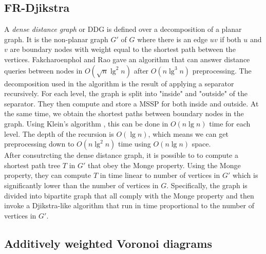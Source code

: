 \subsection{FR-Djikstra}
A \textit{dense distance graph} or DDG is defined over a decomposition of a planar
graph. It is the non-planar graph $G'$ of $G$ where there is an edge $uv$ if both $u$ and
$v$ are boundary nodes with weight equal to the shortest path between the vertices.
Fakcharoenphol and Rao \cite{fakcharoenphol2006planar} gave an algorithm that can answer
distance queries between nodes in $O(\sqrt{n}\lg^2 n)$ after $O(n\lg^3 n)$ preprocessing.
The decomposition used in the algorithm is the result of applying a separator
recursively. For each level, the graph is split into "inside" and "outside" of the
separator. They then compute and store a MSSP for both inside and outside. At the same
time, we obtain the shortest paths between boundary nodes in the graph. Using Klein's
algorithm \cite{klein2005multiple}, this can be done in $O(n\lg n)$ time for each level.
The depth of the recursion is $O(\lg n)$, which means we can get preprocessing down to
$O(n\lg^2 n)$ time using $O(n\lg n)$ space. \\
After consutrcting the dense distance graph, it is possible to to compute a shortest path
tree $T$ in $G'$ that obey the Monge property. Using the Monge property, they can compute
$T$ in time linear to number of vertices in $G'$ which is significantly lower than the
number of vertices in $G$. Specifically, the graph is divided into bipartite graph that
all comply with the Monge property and then invoke a Djikstra-like algorithm that run in
time proportional to the number of vertices in $G'$.

\subsection{Additively weighted Voronoi diagrams}

